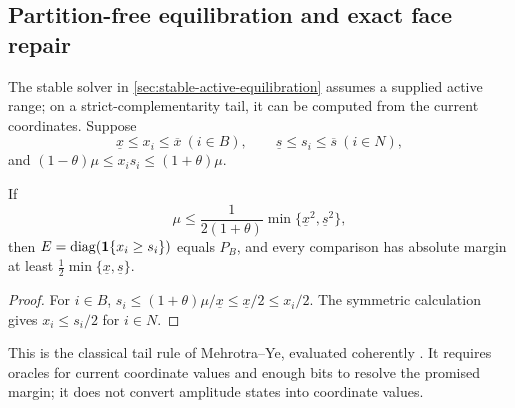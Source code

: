 \subsection{Partition-free equilibration and exact face repair}
\label{sec:positive-face-repair}

The stable solver in \cref{sec:stable-active-equilibration} assumes a
supplied active range; on a strict-complementarity tail, it can be computed
from the current coordinates.  Suppose
\begin{equation}
 \underline x\leq x_i\leq\overline x\ (i\in B),\qquad
 \underline s\leq s_i\leq\overline s\ (i\in N),        \label{eq:positive-tail-margins}
\end{equation}
and $(1-\theta)\mu\leq x_is_i\leq(1+\theta)\mu$.

\begin{lemma}
\label{lem:positive-tail-selector}
If
\begin{equation}
 \mu\leq \frac{1}{2(1+\theta)}
 \min\{\underline x^2,\underline s^2\},                 \label{eq:positive-selector-threshold}
\end{equation}
then $E=\operatorname{diag}({\bf1}\{x_i\geq s_i\})$ equals $P_B$, and every comparison has
absolute margin at least $\frac12\min\{\underline x,\underline s\}$.
\end{lemma}

\begin{proof}
For $i\in B$, $s_i\leq(1+\theta)\mu/\underline x\leq
\underline x/2\leq x_i/2$.  The symmetric calculation gives
$x_i\leq s_i/2$ for $i\in N$.
\end{proof}

This is the classical tail rule of Mehrotra--Ye, evaluated coherently
\cite{positive-mehrotra1993-optimal-face,positive-cartis2016-active-set}.  It
requires oracles for current coordinate values and enough bits to resolve
the promised margin; it does not convert amplitude states into coordinate
values.

